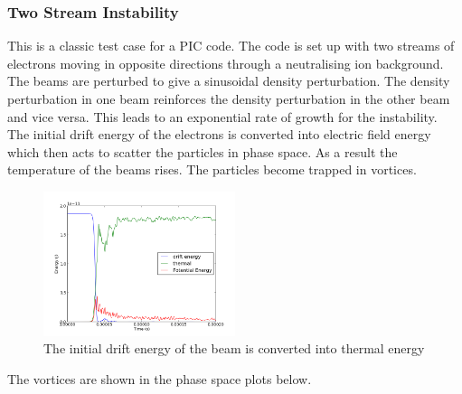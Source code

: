 \documentclass[12pt]{article}
\begin{document}
\subsubsection{Two Stream Instability}
This is a classic test case for a PIC code. The code is set up with two streams of electrons moving in opposite directions through a neutralising ion background. The beams are perturbed to give a sinusoidal density perturbation. The density perturbation in one beam reinforces the density perturbation in the other beam and vice versa. This leads to an exponential rate of growth for the instability. The initial drift energy of the electrons is converted into electric field energy which then acts to scatter the particles in phase space. As a result the temperature of the beams rises. The particles become trapped in vortices. 
\begin{figure}[H]
\centering
\includegraphics[width=0.5\textwidth]{all_energies_2_stream}
\caption{The initial drift energy of the beam is converted into thermal energy}
\label{fig:Leapfrog}
\end{figure}
The vortices are shown in the phase space plots below. 
\end{document}
